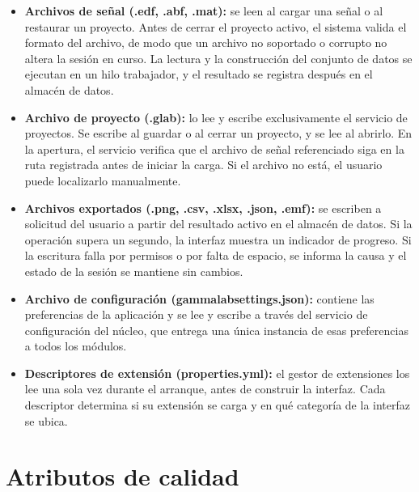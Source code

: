 \documentclass[11pt,a4paper]{article}
\DeclareRobustCommand{\_}{\textunderscore\allowbreak}
\begin{document}
\begin{itemize}
    \item \textbf{Archivos de señal (.edf, .abf, .mat):} se leen al cargar una señal o 
    al restaurar un proyecto. Antes de cerrar el proyecto activo, el sistema valida el 
    formato del archivo, de modo que un archivo no soportado o corrupto no altera la 
    sesión en curso. La lectura y la construcción del conjunto de datos se ejecutan en 
    un hilo trabajador, y el resultado se registra después en el almacén de datos.

    \item \textbf{Archivo de proyecto (.glab):} lo lee y escribe exclusivamente el 
    servicio de proyectos. Se escribe al guardar o al cerrar un proyecto, y se lee al 
    abrirlo. En la apertura, el servicio verifica que el archivo de señal referenciado 
    siga en la ruta registrada antes de iniciar la carga. Si el archivo no está, el 
    usuario puede localizarlo manualmente.

    \item \textbf{Archivos exportados (.png, .csv, .xlsx, .json, .emf):} se escriben a 
    solicitud del usuario a partir del resultado activo en el almacén de datos. Si la 
    operación supera un segundo, la interfaz muestra un indicador de progreso. Si la 
    escritura falla por permisos o por falta de espacio, se informa la causa y el 
    estado de la sesión se mantiene sin cambios.

    \item \textbf{Archivo de configuración (gamma\_lab\_settings.json):} contiene las 
    preferencias de la aplicación y se lee y escribe a través del servicio de 
    configuración del núcleo, que entrega una única instancia de esas preferencias a 
    todos los módulos.

    \item \textbf{Descriptores de extensión (properties.yml):} el gestor de extensiones 
    los lee una sola vez durante el arranque, antes de construir la interfaz. Cada 
    descriptor determina si su extensión se carga y en qué categoría de la interfaz se 
    ubica.
\end{itemize}


\section{Atributos de calidad}
\label{sec:escenarios_calidad}
\end{document}
